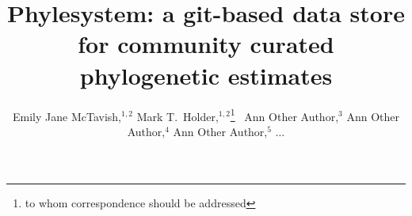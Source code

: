 \documentclass{bioinfo}
\begin{document}
\title[phylesystem git phylostore]{Phylesystem: a git-based data store for community curated phylogenetic estimates}

\author[McTavish\textit{et~al}]{
    Emily Jane McTavish,$^{1,2}$
    Mark T.~Holder,$^{1,2}$\footnote{to whom correspondence should be addressed}~
    Ann Other Author,$^{3}$
    Ann Other Author,$^{4}$
    Ann Other Author,$^{5}$ $\ldots$
}
\address{$^{1}$Department of Ecology and Evolutionary Biology, University of Kansas, Lawrence KS, USA\\
$^{2}$Heidelberg Institute of Theoretical Studies, Heidelberg, Germany}



\maketitle
\end{document}
